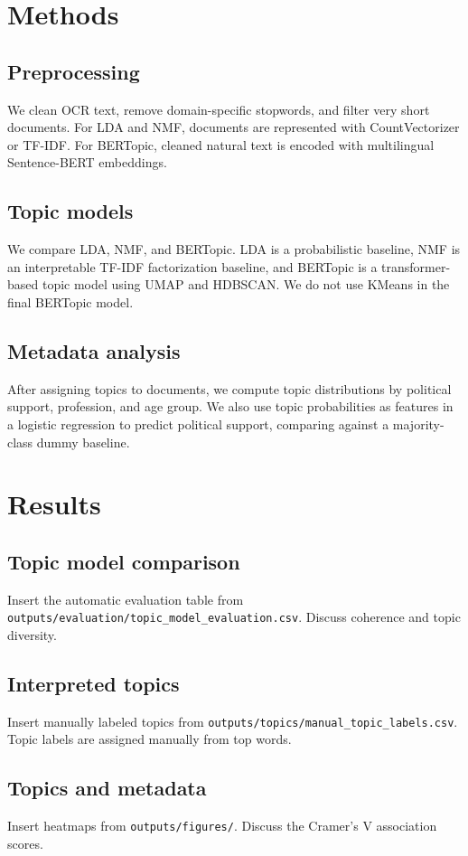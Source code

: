 \documentclass{article}
\begin{document}
\section{Methods}
\subsection{Preprocessing}
We clean OCR text, remove domain-specific stopwords, and filter very short documents. For LDA and NMF, documents are represented with CountVectorizer or TF-IDF. For BERTopic, cleaned natural text is encoded with multilingual Sentence-BERT embeddings.

\subsection{Topic models}
We compare LDA, NMF, and BERTopic. LDA is a probabilistic baseline, NMF is an interpretable TF-IDF factorization baseline, and BERTopic is a transformer-based topic model using UMAP and HDBSCAN. We do not use KMeans in the final BERTopic model.

\subsection{Metadata analysis}
After assigning topics to documents, we compute topic distributions by political support, profession, and age group. We also use topic probabilities as features in a logistic regression to predict political support, comparing against a majority-class dummy baseline.

\section{Results}
\subsection{Topic model comparison}
Insert the automatic evaluation table from \texttt{outputs/evaluation/topic\_model\_evaluation.csv}. Discuss coherence and topic diversity.

\subsection{Interpreted topics}
Insert manually labeled topics from \texttt{outputs/topics/manual\_topic\_labels.csv}. Topic labels are assigned manually from top words.

\subsection{Topics and metadata}
Insert heatmaps from \texttt{outputs/figures/}. Discuss the Cramer's V association scores.
\end{document}
